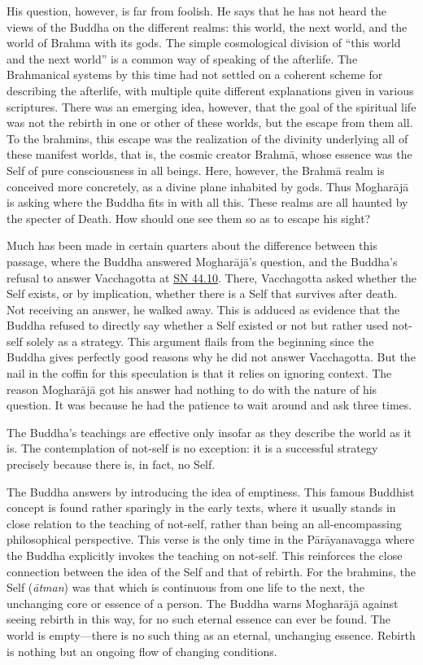 \documentclass[12pt,openany]{book}%
\begin{document}
His question, however, is far from foolish. He says that he has not heard the views of the Buddha on the different realms: this world, the next world, and the world of Brahma with its gods. The simple cosmological division of “this world and the next world” is a common way of speaking of the afterlife. The Brahmanical systems by this time had not settled on a coherent scheme for describing the afterlife, with multiple quite different explanations given in various scriptures. There was an emerging idea, however, that the goal of the spiritual life was not the rebirth in one or other of these worlds, but the escape from them all. To the brahmins, this escape was the realization of the divinity underlying all of these manifest worlds, that is, the cosmic creator \textsanskrit{Brahmā}, whose essence was the Self of pure consciousness in all beings. Here, however, the \textsanskrit{Brahmā} realm is conceived more concretely, as a divine plane inhabited by gods. Thus \textsanskrit{Mogharājā} is asking where the Buddha fits in with all this. These realms are all haunted by the specter of Death. How should one see them so as to escape his sight?

Much has been made in certain quarters about the difference between this passage, where the Buddha answered \textsanskrit{Mogharājā}’s question, and the Buddha’s refusal to answer Vacchagotta at \href{https://suttacentral.net/sn44.10/en/sujato}{SN 44.10}. There, Vacchagotta asked whether the Self exists, or by implication, whether there is a Self that survives after death. Not receiving an answer, he walked away. This is adduced as evidence that the Buddha refused to directly say whether a Self existed or not but rather used not-self solely as a strategy. This argument flails from the beginning since the Buddha gives perfectly good reasons why he did not answer Vacchagotta. But the nail in the coffin for this speculation is that it relies on ignoring context. The reason \textsanskrit{Mogharājā} got his answer had nothing to do with the nature of his question. It was because he had the patience to wait around and ask three times.

The Buddha’s teachings are effective only insofar as they describe the world as it is. The contemplation of not-self is no exception: it is a successful strategy precisely because there is, in fact, no Self.

The Buddha answers by introducing the idea of emptiness. This famous Buddhist concept is found rather sparingly in the early texts, where it usually stands in close relation to the teaching of not-self, rather than being an all-encompassing philosophical perspective. This verse is the only time in the \textsanskrit{Pārāyanavagga} where the Buddha explicitly invokes the teaching on not-self. This reinforces the close connection between the idea of the Self and that of rebirth. For the brahmins, the Self (\textit{\textsanskrit{ātman}}) was that which is continuous from one life to the next, the unchanging core or essence of a person. The Buddha warns \textsanskrit{Mogharājā} against seeing rebirth in this way, for no such eternal essence can ever be found. The world is empty—there is no such thing as an eternal, unchanging essence. Rebirth is nothing but an ongoing flow of changing conditions.
\end{document}
